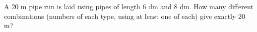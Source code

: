 A $20$ m pipe run is laid using pipes of length $6$ dm and $8$ dm. How many different combinations (numbers of each type, using at least one of each) give exactly $20$ m?
